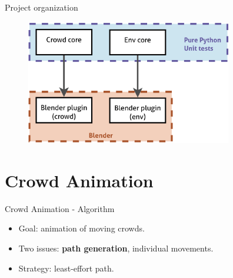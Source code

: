 \documentclass{beamer}
\begin{document}
\begin{frame}{Project organization}
  \begin{figure}
    \begin{center}
      \includegraphics[width=9cm]{orga.pdf}
    \end{center}
  \end{figure}
\end{frame}


\section{Crowd Animation}
\begin{frame}{Crowd Animation - Algorithm}
\begin{itemize}
  \item Goal: animation of moving crowds.
  \item Two issues: \textbf{path generation}, individual movements.
  \item Strategy: least-effort path.
\end{itemize}




   
\end{frame}
\end{document}
